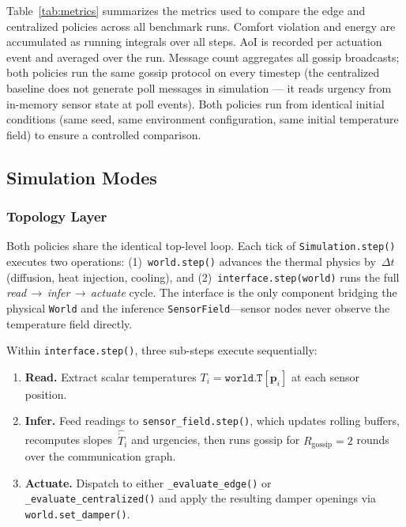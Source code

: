 \documentclass[conference]{IEEEtran}
\begin{document}
Table~\ref{tab:metrics} summarizes the metrics used to compare the edge and centralized policies across all benchmark runs.
Comfort violation and energy are accumulated as running integrals over all
steps.  AoI is recorded per actuation event and averaged over the run.
Message count aggregates all gossip broadcasts; both policies run the same
gossip protocol on every timestep (the centralized baseline does not generate
poll messages in simulation --- it reads urgency from in-memory sensor state
at poll events).  Both policies run from identical initial conditions (same
seed, same environment configuration, same initial temperature field) to
ensure a controlled comparison.

\subsection{Simulation Modes}

\subsubsection{\textbf{Topology Layer}} 

Both policies share the identical top-level loop. Each tick of \texttt{Simulation.step()} executes two operations: (1)~\texttt{world.step()} advances the thermal physics by~$\Delta t$ (diffusion, heat injection, cooling), and (2)~\texttt{interface.step(world)} runs the full \textit{read\,$\rightarrow$\,infer\,$\rightarrow$\,actuate} cycle. The interface is the only component bridging the physical \texttt{World} and the inference \texttt{SensorField}---sensor nodes never observe the temperature field directly.

Within \texttt{interface.step()}, three sub-steps execute sequentially:
\begin{enumerate}
    \item \textbf{Read.} Extract scalar temperatures $T_i = \texttt{world.T}[\mathbf{p}_i]$ at each sensor position.
    \item \textbf{Infer.} Feed readings to \texttt{sensor\_field.step()}, which updates rolling buffers, recomputes slopes~$\hat{\dot{T}}_i$ and urgencies, then runs gossip for $R_{\text{gossip}}=2$ rounds over the communication graph.
    \item \textbf{Actuate.} Dispatch to either \texttt{\_evaluate\_edge()} or \texttt{\_evaluate\_centralized()} and apply the resulting damper openings via \texttt{world.set\_damper()}.
\end{enumerate}
\end{document}
